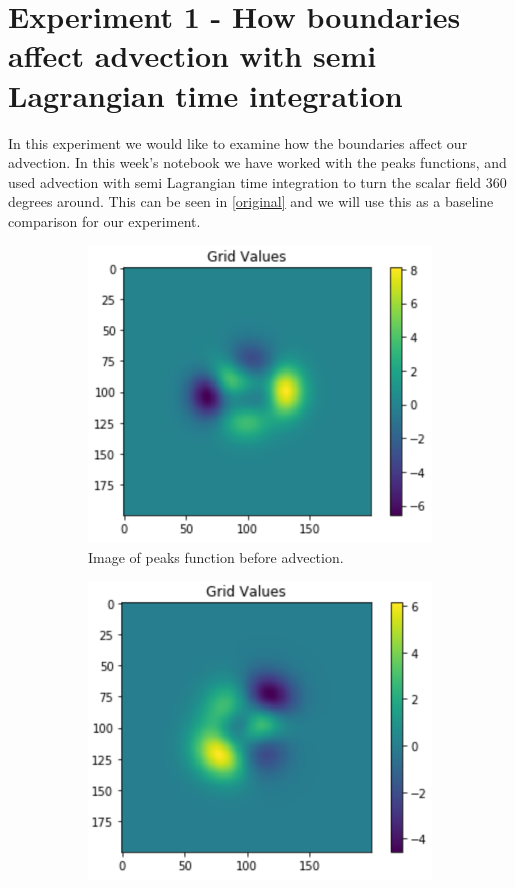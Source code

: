 \section{Experiment 1 - How boundaries affect advection with semi Lagrangian time integration}
In this experiment we would like to examine how the boundaries affect our advection. In this week's notebook we have worked with the peaks functions, and used advection with semi Lagrangian time integration to turn the scalar field 360 degrees around. This can be seen in \autoref{original} and we will use this as a baseline comparison for our experiment.
\begin{figure}[H]
	\centering
	\begin{subfigure}[b]{0.40\linewidth}
		\centering
		\includegraphics[width=\linewidth]{Materials/Lagrangian/ot0}
		\caption{Image of peaks function before advection.}
		\label{ot0}
	\end{subfigure}
	\hfill
	\begin{subfigure}[b]{0.40\linewidth}
		\centering
		\includegraphics[width=\linewidth]{Materials/Lagrangian/ot1}

\end{subfigure}
\end{figure}

